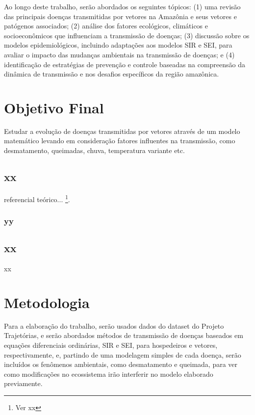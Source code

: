 \documentclass[12pt]{article}
\begin{document}
Ao longo deste trabalho, serão abordados os seguintes tópicos: (1) uma revisão das principais doenças transmitidas por vetores na Amazônia e seus vetores e patógenos associados; (2) análise dos fatores ecológicos, climáticos e socioeconômicos que influenciam a transmissão de doenças; (3) discussão sobre os modelos epidemiológicos, incluindo adaptações aos modelos SIR e SEI, para avaliar o impacto das mudanças ambientais na transmissão de doenças; e (4) identificação de estratégias de prevenção e controle baseadas na compreensão da dinâmica de transmissão e nos desafios específicos da região amazônica.

\newpage
\section{Objetivo Final}

Estudar a evolução de doenças transmitidas por vetores através de um modelo matemático levando em consideração fatores influentes na transmissão, como desmatamento, queimadas, chuva, temperatura variante etc.

\subsection{xx}

referencial teórico... \footnote{Ver xx}.

\subsubsection{yy}

\newpage
\subsection{xx}

xx

\newpage
\section{Metodologia}

Para a elaboração do trabalho, serão usados dados do dataset do Projeto Trajetórias, e serão abordados métodos de transmissão de doenças baseados em equações diferenciais ordinárias, SIR e SEI, para hospedeiros e vetores, respectivamente, e, partindo de uma modelagem simples de cada doença, serão incluídos os fenômenos ambientais, como desmatamento e queimada, para ver como modificações no ecossistema irão interferir no modelo elaborado previamente. 
\end{document}
